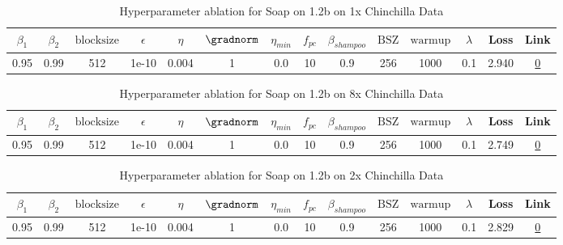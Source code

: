 \begin{table}[H]
\centering
\caption{Hyperparameter ablation for Soap on 1.2b on 1x Chinchilla Data}
\label{tab:ablation_soap_1.2b_1}
\begin{tabular}{cccccccccccccc}
\toprule
$\beta_1$ & $\beta_2$ & $\mathrm{block size}$ & $\epsilon$ & $\eta$ & $\gradnorm$ & $\eta_{min}$ & $f_{pc}$ & $\beta_{shampoo}$ & $\mathrm{BSZ}$ & $\mathrm{warmup}$ & $\lambda$ & Loss & Link \\
\midrule
0.95 & 0.99 & 512 & 1e-10 & 0.004 & 1 & 0.0 & 10 & 0.9 & 256 & 1000 & 0.1 & 2.940 & \href{https://wandb.ai/stanford-mercury/optimizer-scaling/runs/sweep-1.2b-24B-soapebf16d04f58lr0.004-wd0.1-minlr0.0-warmup1000--82b8d3}{0} \\
\midrule
\bottomrule
\end{tabular}
\end{table}

\begin{table}[H]
\centering
\caption{Hyperparameter ablation for Soap on 1.2b on 8x Chinchilla Data}
\label{tab:ablation_soap_1.2b_8}
\begin{tabular}{cccccccccccccc}
\toprule
$\beta_1$ & $\beta_2$ & $\mathrm{block size}$ & $\epsilon$ & $\eta$ & $\gradnorm$ & $\eta_{min}$ & $f_{pc}$ & $\beta_{shampoo}$ & $\mathrm{BSZ}$ & $\mathrm{warmup}$ & $\lambda$ & Loss & Link \\
\midrule
0.95 & 0.99 & 512 & 1e-10 & 0.004 & 1 & 0.0 & 10 & 0.9 & 256 & 1000 & 0.1 & 2.749 & \href{https://wandb.ai/stanford-mercury/optimizer-scaling/runs/sweep-1.2b-193B-soapeweightf32ebf088lr0.004-wd0.1-minlr0.0-warmu-029405}{0} \\
\midrule
\bottomrule
\end{tabular}
\end{table}

\begin{table}[H]
\centering
\caption{Hyperparameter ablation for Soap on 1.2b on 2x Chinchilla Data}
\label{tab:ablation_soap_1.2b_2}
\begin{tabular}{cccccccccccccc}
\toprule
$\beta_1$ & $\beta_2$ & $\mathrm{block size}$ & $\epsilon$ & $\eta$ & $\gradnorm$ & $\eta_{min}$ & $f_{pc}$ & $\beta_{shampoo}$ & $\mathrm{BSZ}$ & $\mathrm{warmup}$ & $\lambda$ & Loss & Link \\
\midrule
0.95 & 0.99 & 512 & 1e-10 & 0.004 & 1 & 0.0 & 10 & 0.9 & 256 & 1000 & 0.1 & 2.829 & \href{https://wandb.ai/stanford-mercury/optimizer-scaling/runs/sweep-1.2b-48B-soapeweightf32ae127elr0.004-wd0.1-minlr0.0-warmup-000547}{0} \\
\midrule
\bottomrule
\end{tabular}
\end{table}

